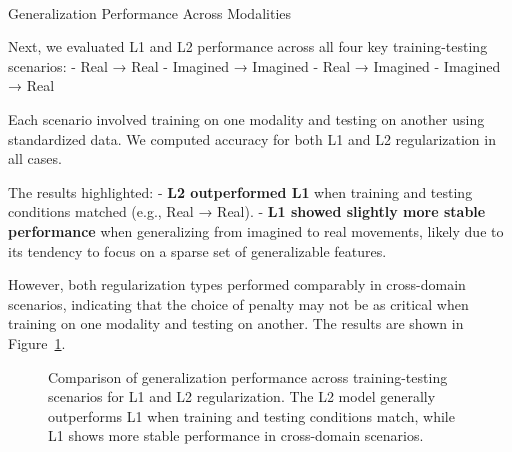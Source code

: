 \documentclass[
  letterpaper,
  DIV=11,
  numbers=noendperiod]{scrartcl}
\makeatletter
\let\oldparagraph\paragraph
\renewcommand{\paragraph}{
    \@ifstar
      \xxxParagraphStar
      \xxxParagraphNoStar
  }
\newcommand{\xxxParagraphStar}[1]{\oldparagraph*{#1}\mbox{}}
\newcommand{\xxxParagraphNoStar}[1]{\oldparagraph{#1}\mbox{}}
\makeatother
\begin{document}
\paragraph{Generalization Performance Across
Modalities}\label{generalization-performance-across-modalities}

Next, we evaluated L1 and L2 performance across all four key
training-testing scenarios: - Real → Real - Imagined → Imagined - Real →
Imagined - Imagined → Real

Each scenario involved training on one modality and testing on another
using standardized data. We computed accuracy for both L1 and L2
regularization in all cases.

The results highlighted: - \textbf{L2 outperformed L1} when training and
testing conditions matched (e.g., Real → Real). - \textbf{L1 showed
slightly more stable performance} when generalizing from imagined to
real movements, likely due to its tendency to focus on a sparse set of
generalizable features.

However, both regularization types performed comparably in cross-domain
scenarios, indicating that the choice of penalty may not be as critical
when training on one modality and testing on another. The results are
shown in Figure~\ref{fig-l1_vs_l2_generalization}.

\begin{figure}


\caption{\label{fig-l1_vs_l2_generalization}Comparison of generalization
performance across training-testing scenarios for L1 and L2
regularization. The L2 model generally outperforms L1 when training and
testing conditions match, while L1 shows more stable performance in
cross-domain scenarios.}

\end{figure}%
\end{document}
